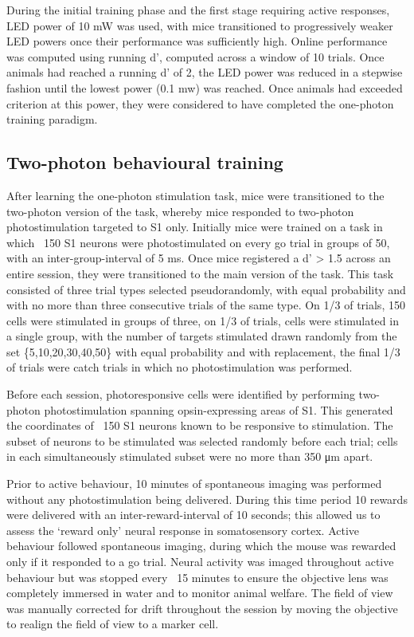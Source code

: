 During the initial training phase and the first stage requiring active responses,  LED power of 10 mW was used, with mice transitioned to progressively weaker LED powers once their performance was sufficiently high. Online performance was computed using running d', computed across a window of 10 trials. Once animals had reached a running d' of 2, the LED power was reduced in a stepwise fashion until the lowest power (0.1 mw) was reached. Once animals had exceeded criterion at this power, they were considered to have completed the one-photon training paradigm.

\subsection{Two-photon behavioural training}

After learning the one-photon stimulation task, mice were transitioned to the two-photon version of the task, whereby mice responded to two-photon photostimulation targeted to S1 only. Initially mice were trained on a task in which ~150 S1 neurons were photostimulated on every go trial in groups of 50, with an inter-group-interval of 5 ms.  Once mice registered a d' > 1.5 across an entire session, they were transitioned to the main version of the task. This task consisted of three trial types selected pseudorandomly, with equal probability and with no more than three consecutive trials of the same type. On 1/3 of trials, 150 cells were stimulated in groups of three, on 1/3 of trials, cells were stimulated in a single group, with the number of targets stimulated drawn randomly from the set \{5,10,20,30,40,50\} with equal probability and with replacement, the final 1/3 of trials were catch trials in which no photostimulation was performed. 

Before each session, photoresponsive cells were identified by performing two-photon photostimulation spanning opsin-expressing areas of S1. This generated the coordinates of ~150 S1 neurons known to be responsive to stimulation. The subset of neurons to be stimulated was selected randomly before each trial; cells in each simultaneously stimulated subset were no more than 350 μm apart. 

Prior to active behaviour, 10 minutes of spontaneous imaging was performed without any photostimulation being delivered. During this time period 10 rewards were delivered with an inter-reward-interval of 10 seconds; this allowed us to assess the ‘reward only’ neural response in somatosensory cortex. Active behaviour followed spontaneous imaging, during which the mouse was rewarded only if it responded to a go trial. Neural activity was imaged throughout active behaviour but was stopped every ~15 minutes to ensure the objective lens was completely immersed in water and to monitor animal welfare. The field of view was manually corrected for drift throughout the session by moving the objective to realign the field of view to a marker cell.

